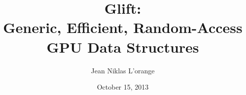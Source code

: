 \documentclass[xcolor={usenames,dvipsnames}]{beamer}
\title[Glift: Generic, Efficient, Random-Access GPU Data Structures]%
      {Glift:\\ Generic, Efficient, Random-Access GPU Data Structures}
\author{Jean Niklas L'orange}
\institute{\texttt{jeannikl@hypirion.com}}
\date{October 15, 2013}
\begin{document}
\begin{frame}
  \titlepage
\end{frame}
\end{document}
